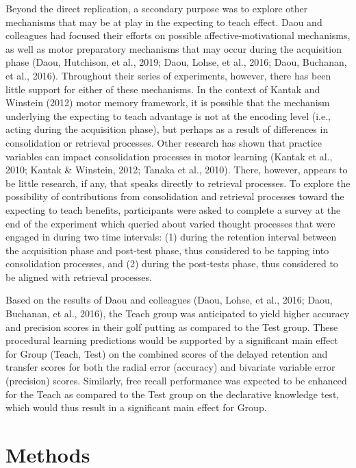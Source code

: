 \documentclass[
  english,
  man,floatsintext]{apa7}
\begin{document}
Beyond the direct replication, a secondary purpose was to explore other mechanisms that may be at play in the expecting to teach effect. Daou and colleagues had focused their efforts on possible affective-motivational mechanisms, as well as motor preparatory mechanisms that may occur during the acquisition phase (Daou, Hutchison, et al., 2019; Daou, Lohse, et al., 2016; Daou, Buchanan, et al., 2016). Throughout their series of experiments, however, there has been little support for either of these mechanisms. In the context of Kantak and Winstein (2012) motor memory framework, it is possible that the mechanism underlying the expecting to teach advantage is not at the encoding level (i.e., acting during the acquisition phase), but perhaps as a result of differences in consolidation or retrieval processes. Other research has shown that practice variables can impact consolidation processes in motor learning (Kantak et al., 2010; Kantak \& Winstein, 2012; Tanaka et al., 2010). There, however, appears to be little research, if any, that speaks directly to retrieval processes. To explore the possibility of contributions from consolidation and retrieval processes toward the expecting to teach benefits, participants were asked to complete a survey at the end of the experiment which queried about varied thought processes that were engaged in during two time intervals: (1) during the retention interval between the acquisition phase and post-test phase, thus considered to be tapping into consolidation processes, and (2) during the post-tests phase, thus considered to be aligned with retrieval processes.

Based on the results of Daou and colleagues (Daou, Lohse, et al., 2016; Daou, Buchanan, et al., 2016), the Teach group was anticipated to yield higher accuracy and precision scores in their golf putting as compared to the Test group. These procedural learning predictions would be supported by a significant main effect for Group (Teach, Test) on the combined scores of the delayed retention and transfer scores for both the radial error (accuracy) and bivariate variable error (precision) scores. Similarly, free recall performance was expected to be enhanced for the Teach as compared to the Test group on the declarative knowledge test, which would thus result in a significant main effect for Group.

\hypertarget{methods}{%
\section{Methods}\label{methods}}
\end{document}
